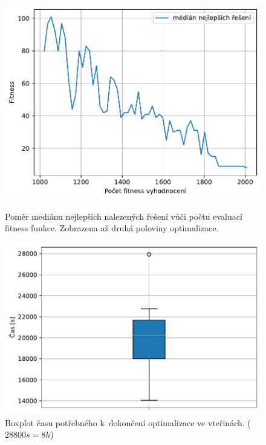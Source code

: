 \begin{figure}[H]
    \begin{minipage}[t]{0.475\linewidth}
    	\includegraphics[width=\textwidth]{obrazky-figures/statistics/HIFU/blob/20/CMAES/bestsToFitness_1.pdf}
    	\caption{Poměr mediánu nejlepších nalezených řešení vůči počtu evaluací fitness funkce. Zobrazena až druhá poloviny optimalizace.}
    	\label{fg:hifu:blob:cmaes:fitPerf}
    \end{minipage}
    \hfill
    \begin{minipage}[t]{0.475\linewidth}
        \includegraphics[width=\linewidth]{obrazky-figures/statistics/HIFU/blob/20/CMAES/timeBoxplot_WithOutliers.pdf}
        \caption{Boxplot času potřebného k~dokončení optimalizace ve vteřinách. ($28800s = 8h$)}
        \label{fg:hifu:blob:cmaes:time}
    \end{minipage}
\end{figure}

